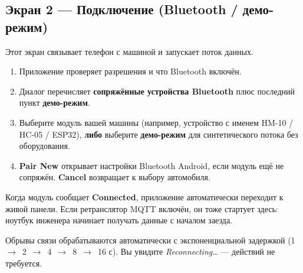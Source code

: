\documentclass[11pt,a4paper,oneside]{report}
\newcommand{\arrow}{\,$\rightarrow$\,}
\begin{document}
\subsection{Экран 2 --- Подключение (Bluetooth / демо-режим)}
Этот экран связывает телефон с машиной и запускает поток данных.
\begin{enumerate}
  \item Приложение проверяет разрешения и что Bluetooth включён.
  \item Диалог перечисляет \textbf{сопряжённые устройства Bluetooth} плюс
    последний пункт \textbf{демо-режим}.
  \item Выберите модуль вашей машины (например, устройство с именем HM-10 / HC-05 /
    ESP32), \textbf{либо} выберите \textbf{демо-режим} для синтетического потока без
    оборудования.
  \item \textbf{Pair New} открывает настройки Bluetooth Android, если модуль ещё не
    сопряжён. \textbf{Cancel} возвращает к выбору автомобиля.
\end{enumerate}
Когда модуль сообщает \textbf{Connected}, приложение автоматически переходит к живой
панели. Если ретранслятор MQTT включён, он тоже стартует здесь: ноутбук инженера
начинает получать данные с началом заезда.
\begin{tgnote}
Обрывы связи обрабатываются автоматически с экспоненциальной задержкой
(1 \arrow{} 2 \arrow{} 4 \arrow{} 8 \arrow{} 16 с). Вы увидите
\emph{Reconnecting\ldots} --- действий не требуется.
\end{tgnote}
\end{document}
